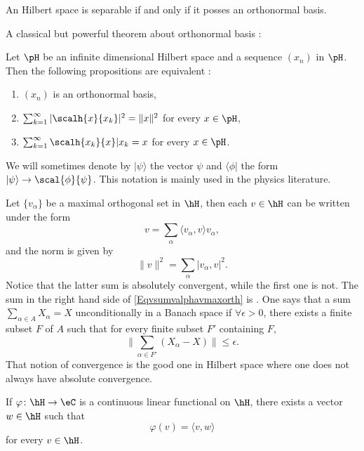 \begin{theorem}
An Hilbert space is separable if and only if it posses an orthonormal basis.
\end{theorem}

A classical but powerful theorem about orthonormal basis :

\begin{theorem}
Let $\pH$ be an infinite dimensional Hilbert space and a sequence $(x_n)$ in $\pH$. Then the following propositions are equivalent :

\begin{enumerate}
\item $(x_n)$ is an orthonormal basis,
\item $\sum_{k=1}^{\infty}|\scalh{x}{x_k}|^2=\|x\|^2$ for every $x\in\pH$,
\item $\sum_{k=1}^{\infty}\scalh{x_k}{x}|x_k=x$ for every $x\in\pH$.
\end{enumerate}
\end{theorem}

We will sometimes denote by $|\psi\rangle$ the vector $\psi$ and $\langle\phi|$ the form $|\psi\rangle\to\scal{ \phi }{ \psi }$. This notation is mainly used in the physics literature.

Let $\{ v_{\alpha} \}$ be a maximal orthogonal set in $\hH$, then each $v\in\hH$ can be written under the form
\begin{equation}		\label{Eqvsumvalphavmaxorth}
	v=\sum_{\alpha}\langle v_{\alpha},v\rangle v_{\alpha},
\end{equation}
and the norm is given by
\begin{equation}
\| v \|^2=\sum_{\alpha}| v_{\alpha},v |^2.
\end{equation}
Notice that the latter sum is absolutely convergent, while the first one is not. The sum in the right hand side of \eqref{Eqvsumvalphavmaxorth} is . One says that a sum $\sum_{\alpha\in A} X_{\alpha}=X$ unconditionally in a Banach space if $\forall\epsilon>0$, there exists a finite subset $F$ of $A$ such that for every finite subset $F'$ containing $F$,
\[ 
  \| \sum_{\alpha\in F'}(X_{\alpha}-X)\| \leq \epsilon.
\]
That notion of convergence is the good one in Hilbert space where one does not always have absolute convergence.

\begin{theorem}		\label{ThoRiesz}
If $\varphi\colon \hH\to \eC$ is a continuous linear functional on $\hH$, there exists a vector $w\in\hH$ such that
\[ 
  \varphi(v)=\langle v, w\rangle 
\]
for every $v\in\hH$.
\end{theorem}

